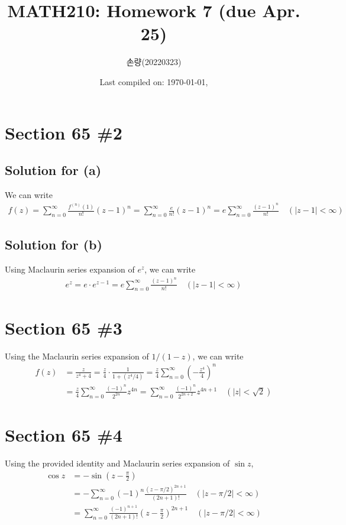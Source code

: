 \documentclass{scrartcl}
\title{MATH210: Homework 7 (due Apr. 25)}
\author{손량(20220323)}
\date{Last compiled on: \today, \currenttime}
\begin{document}
\maketitle

\section{Section 65 \#2}
\subsection{Solution for (a)}
We can write
\begin{align*}
  f(z)
  = \sum^\infty_{n = 0} \frac{f^{(n)}(1)}{n!} (z - 1)^n
  = \sum^\infty_{n = 0} \frac{e}{n!} (z - 1)^n
  = e \sum^\infty_{n = 0} \frac{(z - 1)^n}{n!} \quad (|z - 1| < \infty)
\end{align*}

\subsection{Solution for (b)}
Using Maclaurin series expansion of \(e^z\), we can write
\begin{align*}
  e^z
  = e \cdot e^{z - 1}
  = e \sum^\infty_{n = 0} \frac{(z - 1)^n}{n!} \quad (|z - 1| < \infty)
\end{align*}

\section{Section 65 \#3}
Using the Maclaurin series expansion of \(1 / (1 - z)\), we can write
\begin{align*}
  f(z)
  &= \frac{z}{z^4 + 4}
  = \frac{z}{4} \cdot \frac{1}{1 + (z^4 / 4)}
  = \frac{z}{4} \sum^\infty_{n = 0} \left( -\frac{z^4}{4} \right)^n \\
  &= \frac{z}{4} \sum^\infty_{n = 0} \frac{(-1)^n}{2^{2n}} z^{4n}
  = \sum^\infty_{n = 0} \frac{(-1)^n}{2^{2n + 2}} z^{4n + 1} \quad (|z| < \sqrt{2})
\end{align*}

\section{Section 65 \#4}
Using the provided identity and Maclaurin series expansion of \(\sin z\),
\begin{align*}
  \cos z
  &= -\sin \left( z - \frac{\pi}{2} \right) \\
  &= -\sum^\infty_{n = 0} (-1)^n \frac{(z - \pi / 2)^{2n + 1}}{(2n + 1)!} \quad (|z - \pi / 2| < \infty) \\
  &= \sum^\infty_{n = 0} \frac{(-1)^{n + 1}}{(2n + 1)!} \left( z - \frac{\pi}{2} \right)^{2n + 1} \quad (|z - \pi / 2| < \infty)
\end{align*}
\end{document}
